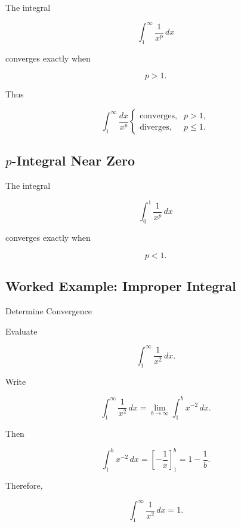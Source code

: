 The integral

\[
\int_1^\infty
\frac{
1
}{
x^p
}
\,dx
\]

converges exactly when

\[
\boxed{
p>1.
}
\]

Thus

\[
\boxed{
\int_1^\infty
\frac{
dx
}{
x^p
}
\begin{cases}
\text{converges}, & p>1,\\
\text{diverges}, & p\leq1.
\end{cases}
}
\]

\subsection{\(p\)-Integral Near Zero}
\label{subsec:p-integral-zero-reference}

The integral

\[
\int_0^1
\frac{
1
}{
x^p
}
\,dx
\]

converges exactly when

\[
\boxed{
p<1.
}
\]

\subsection{Worked Example: Improper Integral}
\label{subsec:worked-improper-integral}

\begin{workedexamplebox}{Determine Convergence}

Evaluate

\[
\int_1^\infty
\frac1{x^2}
\,dx.
\]

Write

\[
\int_1^\infty
\frac1{x^2}
\,dx
=
\lim_{b\to\infty}
\int_1^b
x^{-2}\,dx.
\]

Then

\[
\int_1^b
x^{-2}\,dx
=
\left[
-\frac1x
\right]_1^b
=
1-\frac1b.
\]

Therefore,

\begin{answerbox}
\[
\boxed{
\int_1^\infty
\frac1{x^2}
\,dx
=
1.
}
\]
\end{answerbox}

\end{workedexamplebox}

